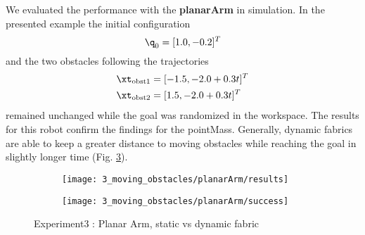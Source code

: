 We evaluated the performance with the \textbf{planarArm} in simulation. In the presented
example the initial configuration \[\q_0 = [1.0, -0.2]^T\] and the two obstacles following
the trajectories
\begin{align*}
  \xt_{\textrm{obst1}} &= [-1.5, -2.0 + 0.3t]^T \\
  \xt_{\textrm{obst2}} &= [1.5, -2.0 + 0.3t]^T \\
\end{align*}
remained unchanged while the goal was randomized in the workspace. The results for this
robot confirm the findings for the pointMass. Generally, dynamic fabrics are able to keep
a greater distance to moving obstacles while reaching the goal in slightly longer time
(Fig. \ref{fig:experiment3_planarArm}).

\begin{figure}[ht]
  \centering
  \begin{subfigure}{0.7\linewidth}
    \centering
    \texttt{[image: 3\_moving\_obstacles/planarArm/results]}
    \caption{}
    \label{subfig:experiment3_planarArm_static_dynamic_res}
  \end{subfigure}%
  \begin{subfigure}{0.3\linewidth}
    \centering
    \texttt{[image: 3\_moving\_obstacles/planarArm/success]}
    \caption{}
    \label{subfig:experiment3_planarArm_static_dynamic_success}
  \end{subfigure}
  \caption{Experiment3 : Planar Arm, static vs dynamic fabric}%
  \label{fig:experiment3_planarArm}
\end{figure}

